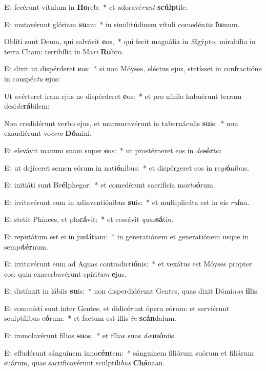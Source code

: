 \item Et fecérunt vítulum in \textbf{Ho}reb:~* et adoravé\textit{runt} \textbf{scúlp}tile.
\item Et mutavérunt glóriam \textbf{su}am~* in similitúdinem vítuli comedén\textit{tis} \textbf{fœ}num.
\item Oblíti sunt Deum, qui salvávit \textbf{e}os,~* qui fecit magnália in Ægýpto, mirabília in terra Cham: terribília in Ma\textit{ri} \textbf{Ru}bro.
\item Et dixit ut dispérderet \textbf{e}os:~* si non Móyses, eléctus ejus, stetísset in confractióne in conspéc\textit{tu} \textbf{e}jus:
\item Ut avérteret iram ejus ne dispérderet \textbf{e}os:~* et pro níhilo habuérunt terram desi\textit{de}\textbf{rá}bilem:
\item Non credidérunt verbo ejus, et murmuravérunt in tabernáculis \textbf{su}is:~* non exaudiérunt vo\textit{cem} \textbf{Dó}mini.
\item Et elevávit manum suam super \textbf{e}os:~* ut prostérneret eos in \textit{de}\textbf{sér}to:
\item Et ut dejíceret semen eórum in nati\textbf{ó}nibus:~* et dispérgeret eos in re\textit{gi}\textbf{ó}nibus.
\item Et initiáti sunt Be\textbf{él}phegor:~* et comedérunt sacrifícia mor\textit{tu}\textbf{ó}rum.
\item Et irritavérunt eum in adinventiónibus \textbf{su}is:~* et multiplicáta est in eis \textit{ru}\textbf{í}na.
\item Et stetit Phínees, et pla\textbf{cá}vit:~* et cessávit \textit{quas}\textbf{sá}tio.
\item Et reputátum est ei in jus\textbf{tí}tiam:~* in generatiónem et generatiónem usque in sem\textit{pi}\textbf{tér}num.
\item Et irritavérunt eum ad Aquas contradicti\textbf{ó}nis:~* et vexátus est Móyses propter eos: quia exacerbavérunt spíri\textit{tum} \textbf{e}jus.
\item Et distínxit in lábiis \textbf{su}is:~* non disperdidérunt Gentes, quas dixit Dómi\textit{nus} \textbf{il}lis.
\item Et commísti sunt inter Gentes, et didicérunt ópera eórum: et serviérunt sculptílibus e\textbf{ó}rum:~* et factum est illis \textit{in} \textbf{scán}dalum.
\item Et immolavérunt fílios \textbf{su}os,~* et fílias suas \textit{dæ}\textbf{mó}niis.
\item Et effudérunt sánguinem inno\textbf{cén}tem:~* sánguinem filiórum suórum et filiárum suárum, quas sacrificavérunt sculptíli\textit{bus} \textbf{Chá}naan.
